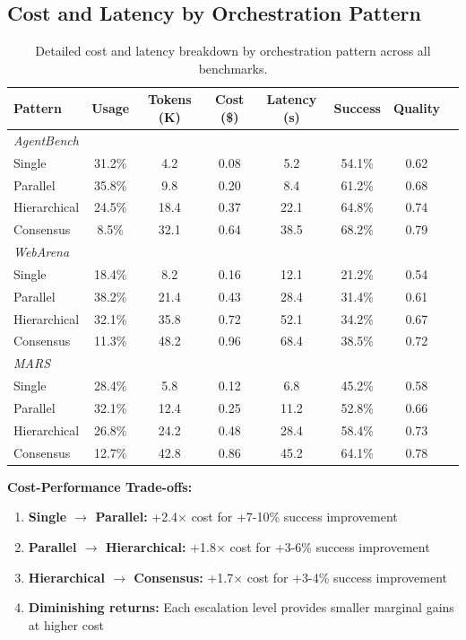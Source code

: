 \documentclass{article}
\theoremstyle{plain}
\theoremstyle{definition}
\theoremstyle{remark}
\begin{document}
\subsection{Cost and Latency by Orchestration Pattern}

\begin{table}[h]
\centering
\caption{Detailed cost and latency breakdown by orchestration pattern across all benchmarks.}
\label{tab:pattern-cost-latency}
\small
\begin{tabular}{lccccccc}
\toprule
\textbf{Pattern} & \textbf{Usage} & \textbf{Tokens (K)} & \textbf{Cost (\$)} & \textbf{Latency (s)} & \textbf{Success} & \textbf{Quality} \\
\midrule
\multicolumn{7}{l}{\textit{AgentBench}} \\
Single & 31.2\% & 4.2 & 0.08 & 5.2 & 54.1\% & 0.62 \\
Parallel & 35.8\% & 9.8 & 0.20 & 8.4 & 61.2\% & 0.68 \\
Hierarchical & 24.5\% & 18.4 & 0.37 & 22.1 & 64.8\% & 0.74 \\
Consensus & 8.5\% & 32.1 & 0.64 & 38.5 & 68.2\% & 0.79 \\
\midrule
\multicolumn{7}{l}{\textit{WebArena}} \\
Single & 18.4\% & 8.2 & 0.16 & 12.1 & 21.2\% & 0.54 \\
Parallel & 38.2\% & 21.4 & 0.43 & 28.4 & 31.4\% & 0.61 \\
Hierarchical & 32.1\% & 35.8 & 0.72 & 52.1 & 34.2\% & 0.67 \\
Consensus & 11.3\% & 48.2 & 0.96 & 68.4 & 38.5\% & 0.72 \\
\midrule
\multicolumn{7}{l}{\textit{MARS}} \\
Single & 28.4\% & 5.8 & 0.12 & 6.8 & 45.2\% & 0.58 \\
Parallel & 32.1\% & 12.4 & 0.25 & 11.2 & 52.8\% & 0.66 \\
Hierarchical & 26.8\% & 24.2 & 0.48 & 28.4 & 58.4\% & 0.73 \\
Consensus & 12.7\% & 42.8 & 0.86 & 45.2 & 64.1\% & 0.78 \\
\bottomrule
\end{tabular}
\end{table}

\textbf{Cost-Performance Trade-offs:}
\begin{enumerate}[nosep,leftmargin=*]
\item \textbf{Single $\to$ Parallel:} +2.4$\times$ cost for +7-10\% success improvement
\item \textbf{Parallel $\to$ Hierarchical:} +1.8$\times$ cost for +3-6\% success improvement
\item \textbf{Hierarchical $\to$ Consensus:} +1.7$\times$ cost for +3-4\% success improvement
\item \textbf{Diminishing returns:} Each escalation level provides smaller marginal gains at higher cost
\end{enumerate}
\end{document}
